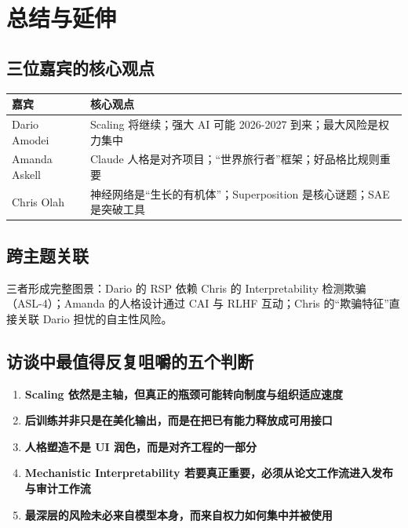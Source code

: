 \section{总结与延伸}

\subsection{三位嘉宾的核心观点}

\begin{table}[H]
\centering
\begin{tabular}{lp{10cm}}
\toprule
\textbf{嘉宾} & \textbf{核心观点} \\
\midrule
Dario Amodei & Scaling 将继续；强大 AI 可能 2026-2027 到来；最大风险是权力集中 \\
Amanda Askell & Claude 人格是对齐项目；``世界旅行者''框架；好品格比规则重要 \\
Chris Olah & 神经网络是``生长的有机体''；Superposition 是核心谜题；SAE 是突破工具 \\
\bottomrule
\end{tabular}
\end{table}

\subsection{跨主题关联}

三者形成完整图景：Dario 的 RSP 依赖 Chris 的 Interpretability 检测欺骗（ASL-4）；Amanda 的人格设计通过 CAI 与 RLHF 互动；Chris 的``欺骗特征''直接关联 Dario 担忧的自主性风险。

\subsection{访谈中最值得反复咀嚼的五个判断}

\begin{enumerate}
    \item \textbf{Scaling 依然是主轴，但真正的瓶颈可能转向制度与组织适应速度}
    \item \textbf{后训练并非只是在美化输出，而是在把已有能力释放成可用接口}
    \item \textbf{人格塑造不是 UI 润色，而是对齐工程的一部分}
    \item \textbf{Mechanistic Interpretability 若要真正重要，必须从论文工作流进入发布与审计工作流}
    \item \textbf{最深层的风险未必来自模型本身，而来自权力如何集中并被使用}
\end{enumerate}


